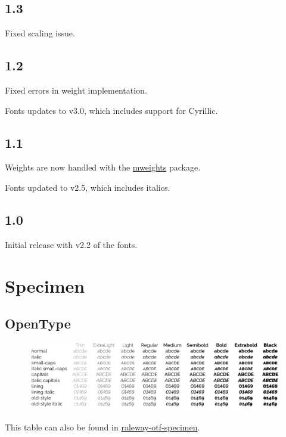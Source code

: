 \documentclass[10pt,a4paper,english]{article}
\newcommand*\file[1]{\href{run:#1.pdf}{#1}}
\begin{document}
\begin{multicols}{2}
\subsection*{1.3}
\begin{itemize*}
	\item Fixed scaling issue.
\end{itemize*}

\subsection*{1.2}
\begin{itemize*}
	\item Fixed errors in weight implementation.
	\item Fonts updates to v3.0, which includes support for Cyrillic.
\end{itemize*}

\subsection*{1.1}
\begin{itemize*}
	\item Weights are now handled with the \href{http://www.ctan.org/pkg/mweights}{mweights} package.
	\item Fonts updated to v2.5, which includes italics.
\end{itemize*}

\subsection*{1.0}
\begin{itemize*}
	\item Initial release with v2.2 of the fonts.
\end{itemize*}


\vspace{0pt plus 1filll}\mbox{}
\newpage
\end{multicols}

\section{Specimen}
\label{sec:specimen}
\subsection{OpenType}
\begin{figure}[ht]
	\centering
	\includegraphics[width=\textwidth]{raleway-otf-specimen}
\end{figure}
This table can also be found in \file{raleway-otf-specimen}.
\end{document}
